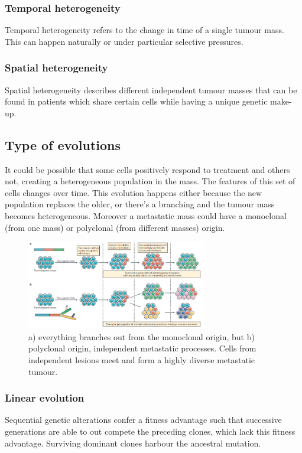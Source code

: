 		\subsubsection{Temporal heterogeneity}
		Temporal heterogeneity refers to the change in time of a single tumour mass.
		This can happen naturally or under particular selective pressures.

		\subsubsection{Spatial heterogeneity}
		Spatial heterogeneity describes different independent tumour masses that can be found in patients which share certain cells while having a unique genetic make-up.

	\subsection{Type of evolutions}
	It could be possible that some cells positively respond to treatment and others not, creating a heterogeneous population in the mass.
	The features of this set of cells changes over time.
	This evolution happens either because the new population replaces the older, or there's a branching and the tumour mass becomes heterogeneous.
	Moreover a metastatic mass could have a monoclonal (from one mass) or polyclonal (from different masses) origin.

	\begin{figure}[H]
		\centering
		\includegraphics[width=0.7\textwidth]{branching.png}
		\caption{ a) everything branches out from the monoclonal origin, but b) polyclonal origin, independent metastatic processes. Cells from independent lesions meet and form a highly diverse metastatic tumour.}
		\label{fig:branching}
	\end{figure}

		\subsubsection{Linear evolution}
		Sequential genetic alterations confer a fitness advantage such that successive generations are able to out compete the preceding clones, which lack this fitness advantage.
		Surviving dominant clones harbour the ancestral mutation.

